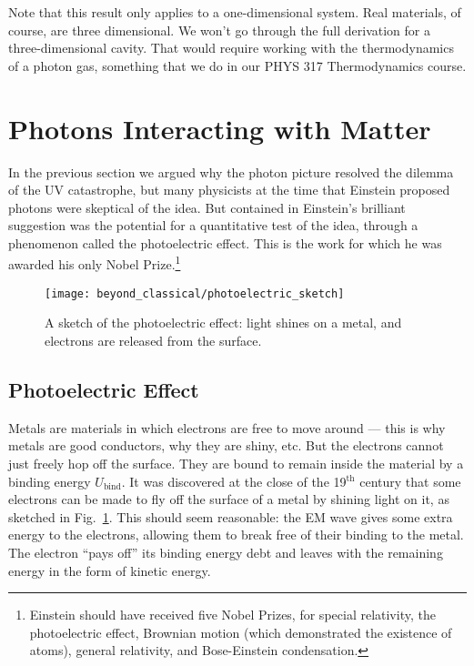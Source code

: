 Note that this result only applies to a one-dimensional system. 
Real materials, of course, are three dimensional.  We won't go through
the full derivation for a three-dimensional cavity.  That would require
working with the thermodynamics of a photon gas, something
that we do in our PHYS 317 Thermodynamics course.  

\section{Photons Interacting with Matter}

In the previous section we argued why the photon picture resolved the
dilemma of the UV catastrophe,  but many physicists at the time that
Einstein proposed photons were skeptical of the idea.  But contained
in Einstein's brilliant suggestion was the potential for a quantitative
test of the idea, through a phenomenon called the photoelectric effect.  
This is the work for which he was awarded his only Nobel 
Prize.\footnote{Einstein
  should have received five Nobel Prizes, for special relativity, the
  photoelectric effect, Brownian motion (which demonstrated the
  existence of atoms), general relativity, and Bose-Einstein
  condensation.}

\begin{figure}
\begin{center}
\texttt{[image: beyond\_classical/photoelectric\_sketch]}
\caption{A sketch of the photoelectric effect: light shines on a metal,
and electrons are released from the surface.}
\label{fig:photoelectric_sketch}
\end{center}
\end{figure}

\subsection{Photoelectric Effect}

Metals are materials in which electrons are free to move around ---
this is why metals are good conductors, why they are shiny, etc. But
the electrons cannot just freely hop off the surface.  They are bound
to remain inside the material by a binding energy $U_\text{bind}$.
It was discovered at the close of the 19$^\text{th}$ century that some
electrons can be made to fly off the surface of a metal by shining light
on it, as sketched in Fig.~\ref{fig:photoelectric_sketch}.  This should
seem reasonable: the EM wave gives some extra energy to the electrons,
allowing them to break free of their binding to the metal.  The electron
``pays off'' its binding energy debt and leaves with the remaining energy
in the form of kinetic energy.

